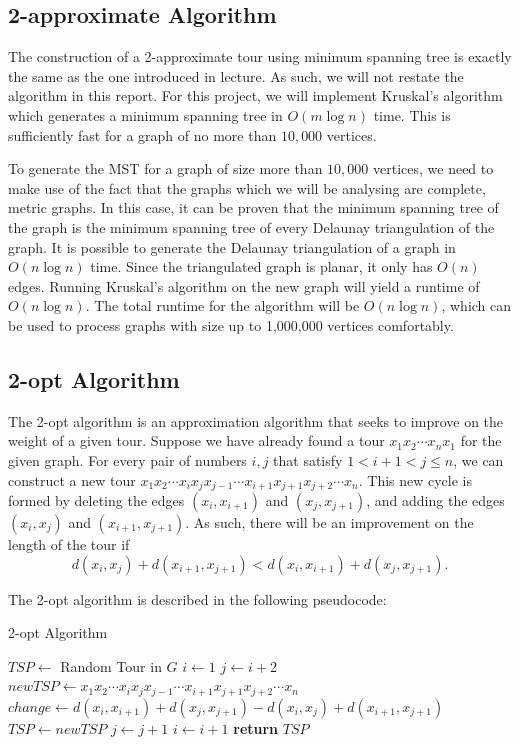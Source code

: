 \documentclass[paper=a4, fontsize=11pt]{scrartcl}	%
\numberwithin{equation}{section}		%
\numberwithin{figure}{section}			%
\numberwithin{table}{section}				%
\begin{document}
\subsection{2-approximate Algorithm}
The construction of a 2-approximate tour using minimum spanning tree is exactly the same as the one introduced in lecture. As such, we will not restate the algorithm in this report. For this project, we will implement Kruskal's algorithm which generates a minimum spanning tree in $O(m \log n)$ time. This is sufficiently fast for a graph of no more than $10,000$ vertices.

To generate the MST for a graph of size more than $10,000$ vertices, we need to make use of the fact that the graphs which we will be analysing are complete, metric graphs. In this case, it can be proven that the minimum spanning tree of the graph is the minimum spanning tree of every Delaunay triangulation of the graph.\cite{sedgewick} It is possible to generate the Delaunay triangulation of a graph in $O(n \log n)$ time. Since the triangulated graph is planar, it only has $O(n)$ edges. Running Kruskal's algorithm on the new graph will yield a runtime of $O(n \log n)$. The total runtime for the algorithm will be $O(n \log n)$, which can be used to process graphs with size up to 1,000,000 vertices comfortably.
\subsection{2-opt Algorithm} The 2-opt algorithm is an approximation algorithm that seeks to improve on the weight of a given tour. Suppose we have already found a tour $x_1x_2\cdots x_nx_1$ for the given graph. For every pair of numbers $i, j$ that satisfy $1 < i+1 < j \le n$, we can construct a new tour $x_1x_2 \cdots x_ix_jx_{j-1} \cdots x_{i+1}x_{j+1}x_{j+2} \cdots x_n$. This new cycle is formed by deleting the edges $(x_i, x_{i+1})$ and $(x_j, x_{j+1})$, and adding the edges $(x_i, x_j)$ and $(x_{i+1}, x_{j+1})$. As such, there will be an improvement on the length of the tour if 
\[d(x_i, x_j) + d(x_{i+1}, x_{j+1})< d(x_i, x_{i+1})+d(x_j, x_{j+1}).\]

The 2-opt algorithm is described in the following pseudocode:

\begin{algorithm}
\caption{2-opt Algorithm}\label{2-opt}
\begin{algorithmic}[1]
   \State $TSP \gets $ Random Tour in $G$
	\State  $i \gets 1$
	\State  $j \gets i+2$
         \State $newTSP \gets x_1x_2 \cdots x_ix_jx_{j-1} \cdots x_{i+1}x_{j+1}x_{j+2} \cdots x_n$
         \State $change \gets  d(x_i, x_{i+1})+d(x_j, x_{j+1}) - d(x_i, x_j) + d(x_{i+1}, x_{j+1})$
         	\State $TSP \gets newTSP$
         \EndIf
         \State $j \gets j+1$
         \EndWhile
\State      $i \gets i+1$
	  \EndWhile
   \EndWhile
   \State \textbf{return} $TSP$
\EndProcedure
\end{algorithmic}
\end{algorithm}
\end{document}

